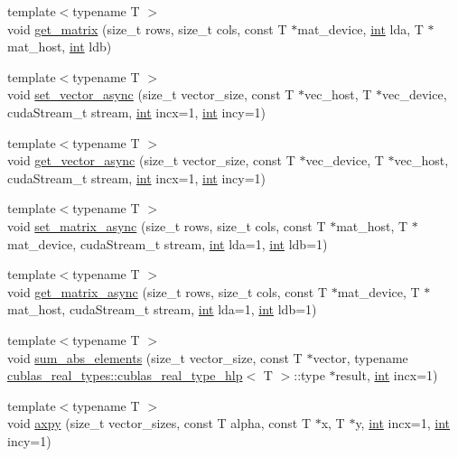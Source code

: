 \begin{DoxyCompactItemize}
\item 
{\footnotesize template$<$typename T $>$ }\\void \hyperlink{classcublas__wrap_ae15fd2da9109110f4fca623dc67ab3ca}{get\-\_\-matrix} (size\-\_\-t rows, size\-\_\-t cols, const T $\ast$mat\-\_\-device, \hyperlink{classint}{int} lda, T $\ast$mat\-\_\-host, \hyperlink{classint}{int} ldb)
\item 
{\footnotesize template$<$typename T $>$ }\\void \hyperlink{classcublas__wrap_a33d0eb829d98fe780a0c1dfd7f8b721b}{set\-\_\-vector\-\_\-async} (size\-\_\-t vector\-\_\-size, const T $\ast$vec\-\_\-host, T $\ast$vec\-\_\-device, cuda\-Stream\-\_\-t stream, \hyperlink{classint}{int} incx=1, \hyperlink{classint}{int} incy=1)
\item 
{\footnotesize template$<$typename T $>$ }\\void \hyperlink{classcublas__wrap_ade572357b830741af9f6043014f8fb47}{get\-\_\-vector\-\_\-async} (size\-\_\-t vector\-\_\-size, const T $\ast$vec\-\_\-device, T $\ast$vec\-\_\-host, cuda\-Stream\-\_\-t stream, \hyperlink{classint}{int} incx=1, \hyperlink{classint}{int} incy=1)
\item 
{\footnotesize template$<$typename T $>$ }\\void \hyperlink{classcublas__wrap_af90664e23d8c5fda89373e18cfcc6b5f}{set\-\_\-matrix\-\_\-async} (size\-\_\-t rows, size\-\_\-t cols, const T $\ast$mat\-\_\-host, T $\ast$mat\-\_\-device, cuda\-Stream\-\_\-t stream, \hyperlink{classint}{int} lda=1, \hyperlink{classint}{int} ldb=1)
\item 
{\footnotesize template$<$typename T $>$ }\\void \hyperlink{classcublas__wrap_a0278a33a13b3e864b0d0322aeb9784f9}{get\-\_\-matrix\-\_\-async} (size\-\_\-t rows, size\-\_\-t cols, const T $\ast$mat\-\_\-device, T $\ast$mat\-\_\-host, cuda\-Stream\-\_\-t stream, \hyperlink{classint}{int} lda=1, \hyperlink{classint}{int} ldb=1)
\item 
{\footnotesize template$<$typename T $>$ }\\void \hyperlink{classcublas__wrap_a26fc427ffd4c1cec9f055c3029590809}{sum\-\_\-abs\-\_\-elements} (size\-\_\-t vector\-\_\-size, const T $\ast$vector, typename \hyperlink{structcublas__real__types_1_1cublas__real__type__hlp}{cublas\-\_\-real\-\_\-types\-::cublas\-\_\-real\-\_\-type\-\_\-hlp}$<$ T $>$\-::type $\ast$result, \hyperlink{classint}{int} incx=1)
\item 
{\footnotesize template$<$typename T $>$ }\\void \hyperlink{classcublas__wrap_a14e412b80a132da9aa5a83457b94a266}{axpy} (size\-\_\-t vector\-\_\-sizes, const T alpha, const T $\ast$x, T $\ast$y, \hyperlink{classint}{int} incx=1, \hyperlink{classint}{int} incy=1)

\end{DoxyCompactItemize}
